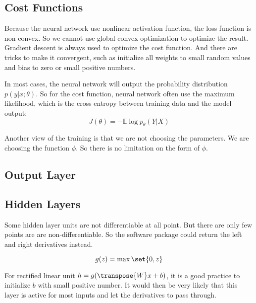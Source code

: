\subsection{Cost Functions}

Because the neural network use nonlinear activation function, the loss function is non-convex. So we cannot use global convex optimization to optimize the result. Gradient descent is always used to optimize the cost function. And there are tricks to make it convergent, such as initialize all weights to small random values and bias to zero or small positive numbers.



In most cases, the neural network will output the probability distribution $p(y|x;\theta)$. So for the cost function, neural network often use the maximum likelihood, which is the cross entropy between training data and the model output:
\begin{equation}
    J(\theta) = - \mathbb{E} \log p_\theta (Y|X)
\end{equation}

Another view of the training is that we are not choosing the parameters. We are choosing the function $\phi$. So there is no limitation on the form of $\phi$.


\subsection{Output Layer}


\subsection{Hidden Layers}

Some hidden layer units are not differentiable at all point. But there are only few points are are non-differentiable. So the software package could return the left and right derivatives instead.


\begin{definition}
    \begin{equation}
        g(z) = \max \set{0, z}
    \end{equation}
\end{definition}

For rectified linear unit $h = g(\transpose{W}x + b)$, it is a good practice to initialize $b$ with small positive number. It would then be very likely that this layer is active for most inputs and let the derivatives to pass through.


